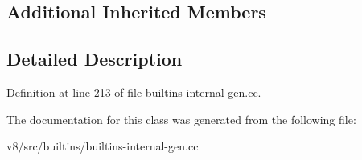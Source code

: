 \subsection*{Additional Inherited Members}


\subsection{Detailed Description}


Definition at line 213 of file builtins-\/internal-\/gen.\+cc.



The documentation for this class was generated from the following file\+:\begin{DoxyCompactItemize}
\item 
v8/src/builtins/builtins-\/internal-\/gen.\+cc\end{DoxyCompactItemize}
